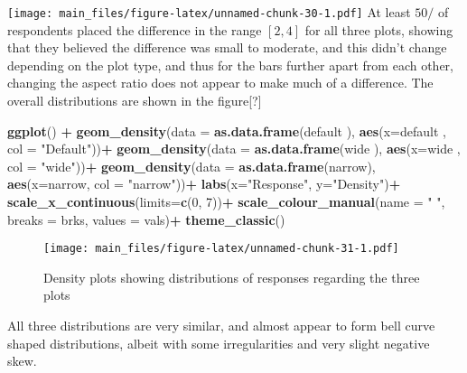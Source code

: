 \documentclass[
]{article}
\newenvironment{Shaded}{\begin{snugshade}}{\end{snugshade}}
\newcommand{\DataTypeTok}[1]{\textcolor[rgb]{0.13,0.29,0.53}{#1}}
\newcommand{\DecValTok}[1]{\textcolor[rgb]{0.00,0.00,0.81}{#1}}
\newcommand{\KeywordTok}[1]{\textcolor[rgb]{0.13,0.29,0.53}{\textbf{#1}}}
\newcommand{\NormalTok}[1]{#1}
\newcommand{\OperatorTok}[1]{\textcolor[rgb]{0.81,0.36,0.00}{\textbf{#1}}}
\newcommand{\StringTok}[1]{\textcolor[rgb]{0.31,0.60,0.02}{#1}}
\begin{document}
\texttt{[image: main\_files/figure-latex/unnamed-chunk-30-1.pdf]} At
least \(50/%
\) of respondents placed the difference in the range \([2, 4]\) for all
three plots, showing that they believed the difference was small to
moderate, and this didn't change depending on the plot type, and thus
for the bars further apart from each other, changing the aspect ratio
does not appear to make much of a difference. The overall distributions
are shown in the figure{[}?{]}

\begin{Shaded}
\begin{Highlighting}[]
\KeywordTok{ggplot}\NormalTok{() }\OperatorTok{+}
\StringTok{  }\KeywordTok{geom_density}\NormalTok{(}\DataTypeTok{data =} \KeywordTok{as.data.frame}\NormalTok{(default ), }\KeywordTok{aes}\NormalTok{(}\DataTypeTok{x=}\NormalTok{default , }\DataTypeTok{col =} \StringTok{"Default"}\NormalTok{))}\OperatorTok{+}
\StringTok{  }\KeywordTok{geom_density}\NormalTok{(}\DataTypeTok{data =} \KeywordTok{as.data.frame}\NormalTok{(wide   ), }\KeywordTok{aes}\NormalTok{(}\DataTypeTok{x=}\NormalTok{wide   , }\DataTypeTok{col =} \StringTok{"wide"}\NormalTok{))}\OperatorTok{+}
\StringTok{  }\KeywordTok{geom_density}\NormalTok{(}\DataTypeTok{data =} \KeywordTok{as.data.frame}\NormalTok{(narrow), }\KeywordTok{aes}\NormalTok{(}\DataTypeTok{x=}\NormalTok{narrow, }\DataTypeTok{col =} \StringTok{"narrow"}\NormalTok{))}\OperatorTok{+}
\StringTok{  }\KeywordTok{labs}\NormalTok{(}\DataTypeTok{x=}\StringTok{"Response"}\NormalTok{, }\DataTypeTok{y=}\StringTok{"Density"}\NormalTok{)}\OperatorTok{+}
\StringTok{  }\KeywordTok{scale_x_continuous}\NormalTok{(}\DataTypeTok{limits=}\KeywordTok{c}\NormalTok{(}\DecValTok{0}\NormalTok{, }\DecValTok{7}\NormalTok{))}\OperatorTok{+}
\StringTok{  }\KeywordTok{scale_colour_manual}\NormalTok{(}\DataTypeTok{name =} \StringTok{" "}\NormalTok{, }\DataTypeTok{breaks =}\NormalTok{ brks, }\DataTypeTok{values =}\NormalTok{ vals)}\OperatorTok{+}
\StringTok{  }\KeywordTok{theme_classic}\NormalTok{()}
\end{Highlighting}
\end{Shaded}

\begin{figure}
\centering
\texttt{[image: main\_files/figure-latex/unnamed-chunk-31-1.pdf]}
\caption{Density plots showing distributions of responses regarding the
three plots}
\end{figure}

All three distributions are very similar, and almost appear to form bell
curve shaped distributions, albeit with some irregularities and very
slight negative skew.
\end{document}
